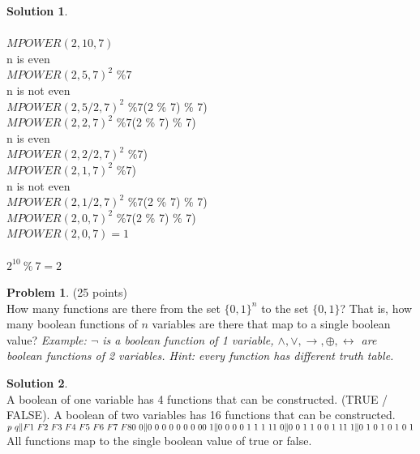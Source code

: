 \documentclass{article}
\theoremstyle{definition}
\newtheorem{problem}{Problem}
\newtheorem*{solution}{Solution}
\begin{document}
\begin{solution}\ \\
\ \\
$MPOWER(2,10,7)$\ \\
n is even\ \\
$MPOWER(2,5,7)^2$ $\% 7$\ \\
n is not even\ \\
$MPOWER(2,5/2,7)^2$ $\% 7$(2 \% 7) \% 7)\ \\
$MPOWER(2,2,7)^2$ $\% 7$(2 \% 7) \% 7)\ \\
n is even\ \\
$MPOWER(2,2/2,7)^2$ $\% 7$)\ \\
$MPOWER(2,1,7)^2$ $\% 7$)\ \\
n is not even\ \\
$MPOWER(2,1/2,7)^2$ $\% 7$(2 \% 7) \% 7)\ \\
$MPOWER(2,0,7)^2$ $\% 7$(2 \% 7) \% 7)\ \\
$MPOWER(2,0,7) = 1$
\ \\
\ \\
$2^{10} \ \% \ 7 =2$
\ \\ 
\end{solution}

\newpage

\begin{problem} (25 points)\\
How many functions are there from the set $\{0,1\}^n$ to the set $\{0,1\}$?  That is, how many boolean functions of $n$ variables are there that map to a single boolean value?  \textit{Example: $\neg$ is a boolean function of 1 variable, $\wedge, \vee, \to, \oplus, \leftrightarrow$ are boolean functions of 2 variables. Hint: every function has different truth table.}
\end{problem}

\begin{solution}\ \\
A boolean of one variable has 4 functions that can be constructed. (TRUE / FALSE). A boolean of two variables has 16 functions that can be constructed.\ \\
$
\ \\
p \ q\|F1 \ F2 \ F3 \ F4 \  F5 \ F6 \ F7 \ F8\ \\
0 \  0\|  0 \  0 \  0  \ 0 \  0 \  0 \  0 \  0\ \\
0 \  1\|  0 \  0 \  0  \ 0  \ 1 \  1  \ 1  \ 1\ \\
1 \  0\|  0 \  0 \ 1 \  1 \  0 \  0 \  1  \ 1\ \\
1 \  1\|  0  \ 1 \  0  \ 1\   0 \  1 \  0  \ 1\ \\
\ \\
$
All functions map to the single boolean value of true or false.
\end{solution}
\end{document}
